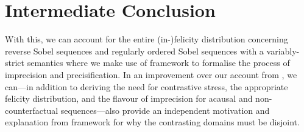\section{Intermediate Conclusion}
With this, we can account for the entire (in-)felicity distribution concerning reverse Sobel sequences and regularly ordered Sobel sequences with a variably-strict semantics where we make use of  framework to formalise the process of imprecision and precisification. In an improvement over our account from , we can---in addition to deriving the need for contrastive stress, the appropriate felicity distribution, and the flavour of imprecision for acausal and non-counterfactual sequences---also provide an independent motivation and explanation from  framework for why the contrasting domains must be disjoint.